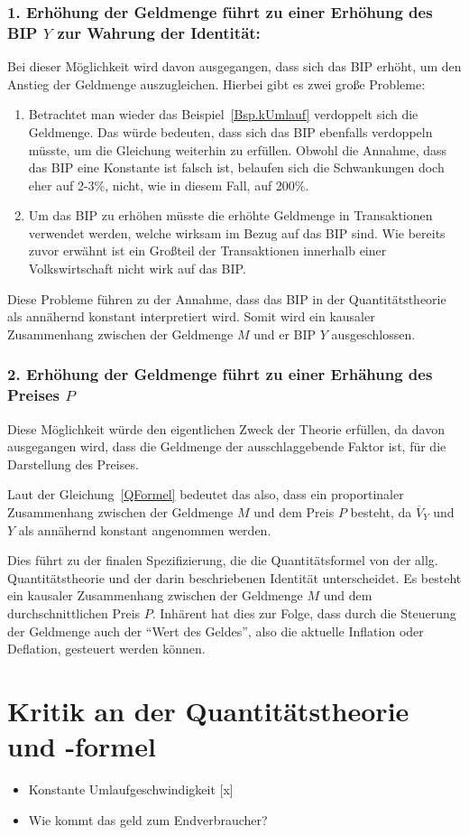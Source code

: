 \subsubsection*{1. Erhöhung der Geldmenge führt zu einer Erhöhung des BIP $Y$ zur Wahrung der Identität:}
Bei dieser Möglichkeit wird davon ausgegangen, dass sich das BIP erhöht, um den Anstieg der Geldmenge auszugleichen. Hierbei gibt es zwei große Probleme:

\begin{enumerate}
    \item Betrachtet man wieder das Beispiel\, \vref*{Bsp.kUmlauf} verdoppelt sich die Geldmenge. Das würde bedeuten, dass sich das BIP ebenfalls verdoppeln müsste, um die Gleichung weiterhin zu erfüllen. Obwohl die Annahme, dass das BIP eine Konstante ist falsch ist, belaufen sich die Schwankungen doch eher auf 2-3\%, nicht, wie in diesem Fall, auf 200\%.
    \item Um das BIP zu erhöhen müsste die erhöhte Geldmenge in Transaktionen verwendet werden, welche wirksam im Bezug auf das BIP sind. Wie bereits zuvor erwähnt ist ein Großteil der Transaktionen innerhalb einer Volkswirtschaft nicht wirk auf das BIP.
\end{enumerate}

Diese Probleme führen zu der Annahme, dass das BIP in der Quantitätstheorie als annähernd konstant interpretiert wird. Somit wird ein kausaler Zusammenhang zwischen der Geldmenge $M$ und er BIP $Y$ ausgeschlossen.

\subsubsection*{2. Erhöhung der Geldmenge führt zu einer Erhähung des Preises $P$}
Diese Möglichkeit würde den eigentlichen Zweck der Theorie erfüllen, da davon ausgegangen wird, dass die Geldmenge der ausschlaggebende Faktor ist, für die Darstellung des Preises.

Laut der Gleichung\, \vref*{QFormel} bedeutet das also, dass ein proportinaler Zusammenhang zwischen der Geldmenge $M$ und dem Preis $P$ besteht, da $\overline{V}_Y$ und $Y$ als annähernd konstant angenommen werden.

Dies führt zu der finalen Spezifizierung, die die Quantitätsformel von der allg. Quantitätstheorie und der darin beschriebenen Identität unterscheidet. Es besteht ein kausaler Zusammenhang zwischen der Geldmenge $M$ und dem durchschnittlichen Preis $P$.
Inhärent hat dies zur Folge, dass durch die Steuerung der Geldmenge auch der \enquote{Wert des Geldes}, also die aktuelle Inflation oder Deflation, gesteuert werden können.

\section{Kritik an der Quantitätstheorie und -formel}

\begin{itemize}
    \item Konstante Umlaufgeschwindigkeit [x]
    \item Wie kommt das geld zum Endverbraucher?
\end{itemize}

\clearpage